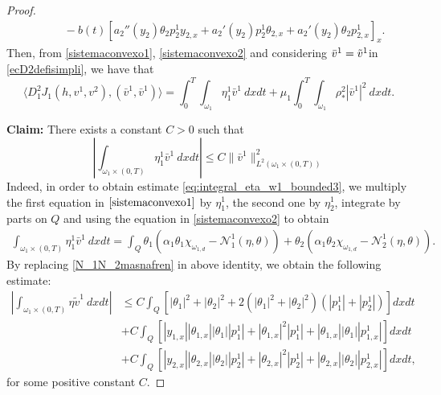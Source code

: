 \documentclass[11pt,a4paper]{amsart}
\numberwithin{equation}{section}
\begin{document}
\begin{proof}
\begin{equation}
\begin{split}
            &\qquad - b(t) \left[ a_2''(y_{2})\theta_2 p^1_2 y_{2,x} + a_2'(y_{2})p^1_2 \theta_{2,x} + a_2'(y_2) \theta_2 p^1_{2,x} \right]_x.
        \end{split}
	\end{equation}Then, from \eqref{sistemaconvexo1}, \eqref{sistemaconvexo2} and considering $\Bar{v}^{1}=\Tilde{v}^{1}$in \eqref{ecD2defisimpli}, we have that
    \begin{equation}
		\label{D2Jigual}
		\langle D_1^2 J_1(h,v^1,v^2), (\bar{v}^{1}, \bar{v}^{1}) \rangle = \int_{0}^{T}\int_{\omega_1} \eta_1^1 \bar{v}^{1} \ dxdt + \mu_1 \int_{0}^{T}\int_{\omega_1} \rho_*^2 |\bar{v}^{1}|^{2} \ dxdt. 
	\end{equation}

\textbf{Claim:}  There exists a constant $C> 0$ such that
\begin{equation}
\label{eq:integral_eta_w1_bounded3}
		\left|\int_{\omega_1 \times (0,T)} \eta_1^1 \bar{v}^{1} \ dxdt\right|\leq C  \|\bar{v}^{1}\|^{2}_{L^2(\omega_1\times (0,T))}
	\end{equation}Indeed, in order to obtain estimate \eqref{eq:integral_eta_w1_bounded3}, we multiply the first equation in  $\eqref{sistemaconvexo1}$ by $\eta_1^1$, the second one by $\eta_2^1$, integrate by parts on $Q$ and using the equation in \eqref{sistemaconvexo2} to obtain
    \begin{align*}
    \int_{\omega_1 \times (0,T)} \eta^1_1\bar{v}^{1} \ dxdt = \int_{Q} \theta_1\left( \alpha_1\theta_1\chi_{\omega_{1,d}} - \mathcal{N}_1^1(\eta,\theta) \right) + \theta_2\left( \alpha_1\theta_2\chi_{\omega_{1,d}} - \mathcal{N}_2^1(\eta,\theta) \right).
    \end{align*}  By replacing \eqref{N_1N_2masnafren}  in above identity, we obtain the following estimate: 
\begin{equation}\label{imporVVVVV}
\begin{split}
\left|\int_{\omega_1 \times (0,T)} \eta \tilde{v}^{1} \ dxdt\right| &\leq C \int_{Q} \left[ |\theta_1|^2 + |\theta_2|^2 +  2(|\theta_1|^2+|\theta_2|^2)(|p_1^1|+|p_2^1|) \right]dxdt\\
&+C \int_Q \left[|y_{1,x}||\theta_{1,x}| |\theta_1| |p^1_1| + |\theta_{1,x}|^2 |p^1_1| + |\theta_{1,x}| |\theta_1| |p^1_{1,x}|\right] dx dt\\
& +C \int_Q \left[ |y_{2,x}||\theta_{2,x}| |\theta_2| |p^1_2| + |\theta_{2,x}|^2 |p^1_2| + |\theta_{2,x}| |\theta_2| |p^1_{2,x}| \right] dxdt, 
\end{split}
\end{equation}for some positive constant $C$.



\end{proof}
\end{document}
